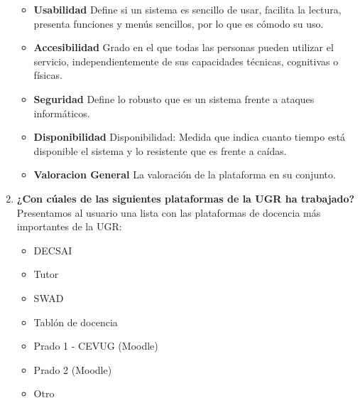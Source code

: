 \begin{enumerate}
  		\begin{itemize}
  			\item \textbf{Usabilidad} Define si un sistema es sencillo de usar, facilita la lectura, presenta funciones y menús sencillos, por lo que es cómodo su uso.
  			\item \textbf{Accesibilidad} Grado en el que todas las personas pueden utilizar el servicio, independientemente de sus capacidades técnicas, cognitivas o físicas.
  			\item \textbf{Seguridad} Define lo robusto que es un sistema frente a ataques informáticos.
  			\item \textbf{Disponibilidad} Disponibilidad: Medida que indica cuanto tiempo está disponible el sistema y lo resistente que es frente a caídas.
  			\item \textbf{Valoracion General} La valoración de la plataforma en su conjunto.

		\end{itemize}


  \item \textbf{¿Con cúales de las siguientes plataformas de la UGR ha trabajado?} Presentamos al usuario una lista con las plataformas de docencia más importantes de la UGR:

  		\begin{itemize}
  			\item DECSAI
            \item Tutor
            \item SWAD
            \item Tablón de docencia
            \item Prado 1 - CEVUG (Moodle)
            \item Prado 2 (Moodle)
            \item Otro
		\end{itemize}


\end{enumerate}
